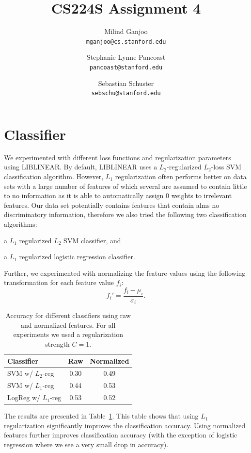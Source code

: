 \documentclass[twocolumn, 11pt]{article}
\title{CS224S Assignment 4}
\author{Milind Ganjoo\\\texttt{mganjoo@cs.stanford.edu}
\and%
Stephanie Lynne Pancoast\\\texttt{pancoast@stanford.edu}
\and%
Sebastian Schuster\\\texttt{sebschu@stanford.edu}}
\date{}
\begin{document}
\maketitle

\section{Classifier}

We experimented with different loss functions and regularization 
parameters using LIBLINEAR.  By default, LIBLINEAR uses a $L_2$-regularized 
$L_2$-loss SVM classification algorithm. However, $L_1$ regularization often performs better 
on  data sets with a large number of features of which several are assumed to contain little to no information
as it is able to automatically assign 0 weights to irrelevant features.
Our data set potentially contains features that contain alms no discriminatory information, 
therefore we also tried the following two classification algorithms: \begin{inparaenum}[1)] 
\item a $L_1$ regularized $L_2$ SVM classifier, and \item a $L_1$ regularized 
logistic regression classifier. \end{inparaenum} Further, we experimented with normalizing the feature
values using the following transformation for each feature value $f_i$:
$$f_i' =  \frac{f_i - \mu_i}{\sigma_i}.$$ 

\begin{table}[b]\centering
  \begin{tabular}{lcc}
    \toprule
    Classifier & Raw  & Normalized \\
    \midrule
    SVM w/ $L_2$-reg & 0.30 & 0.49 \\
    SVM w/ $L_1$-reg & 0.44 & 0.53 \\
    LogReg w/ $L_1$-reg & 0.53 & 0.52  \\
    \bottomrule
  \end{tabular}
  \caption{Accuracy for different classifiers using raw and normalized features. For all experiments we used a regularization strength $C=1$.}\label{tab:results}
\end{table}


The results are presented in Table~\ref{tab:results}. This table shows that using $L_1$ 
regularization significantly improves the classification accuracy. Using 
normalized features further improves classification accuracy 
(with the exception of logistic regression where we see a very small drop in accuracy). 
\end{document}

